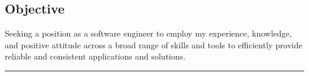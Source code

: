 \documentclass[10pt]{res} %
\begin{document}
\begin{resume}


\section{Objective}
\vspace{8pt} %
Seeking a position as a software engineer to employ my experience, knowledge, and positive attitude across a broad range of skills and tools to efficiently provide reliable and consistent applications and solutions.



 
\noindent\rule{\textwidth}{1pt}



\end{resume}
\end{document}
